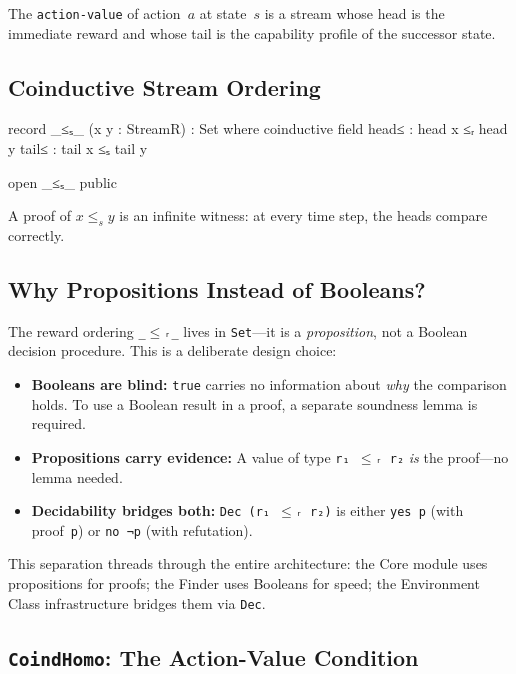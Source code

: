 \documentclass[runningheads]{llncs}
\begin{document}
The \texttt{action-value} of action~$a$ at state~$s$ is a stream whose head is the immediate reward and whose tail is the capability profile of the successor state.

\subsection{Coinductive Stream Ordering}

\begin{code}
  record _≤ₛ_ (x y : StreamR) : Set where
    coinductive
    field
      head≤ : head x ≤ᵣ head y
      tail≤ : tail x ≤ₛ tail y

  open _≤ₛ_ public
\end{code}

\noindent A proof of $x \le_s y$ is an infinite witness: at every time step, the heads compare correctly.

\subsection{Why Propositions Instead of Booleans?}\label{sec:props-vs-bools}

The reward ordering \texttt{\_$\le$ᵣ\_} lives in \texttt{Set}---it is a \emph{proposition}, not a Boolean decision procedure.  This is a deliberate design choice:

\begin{itemize}
\item \textbf{Booleans are blind:} \texttt{true} carries no information about \emph{why} the comparison holds.  To use a Boolean result in a proof, a separate soundness lemma is required.
\item \textbf{Propositions carry evidence:} A value of type \texttt{r₁ $\le$ᵣ r₂} \emph{is} the proof---no lemma needed.
\item \textbf{Decidability bridges both:} \texttt{Dec (r₁ $\le$ᵣ r₂)} is either \texttt{yes p} (with proof~\texttt{p}) or \texttt{no ¬p} (with refutation).
\end{itemize}

\noindent This separation threads through the entire architecture: the Core module uses propositions for proofs; the Finder uses Booleans for speed; the Environment Class infrastructure bridges them via \texttt{Dec}.

\subsection{\texttt{CoindHomo}: The Action-Value Condition}
\end{document}
